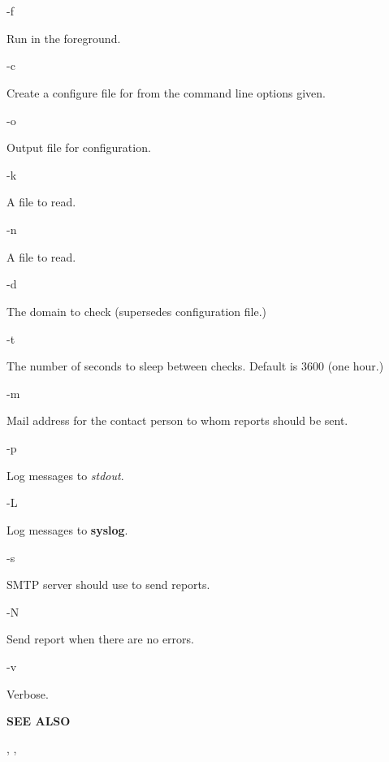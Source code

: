 \begin{description}

\item -f\verb" "

Run in the foreground.

\item -c\verb" "

Create a configure file for  from the command line options given.

\item -o\verb" "

Output file for configuration.

\item -k \verb" "

A  file to read.

\item -n \verb" "

A  file to read.

\item -d\verb" "

The domain to check (supersedes configuration file.)

\item -t\verb" "

The number of seconds to sleep between checks.  Default is 3600 (one hour.)

\item -m\verb" "

Mail address for the contact person to whom reports should be sent.

\item -p\verb" "

Log messages to {\it stdout}.

\item -L\verb" "

Log messages to {\bf syslog}.

\item -s\verb" "

SMTP server  should use to send reports.

\item -N\verb" "

Send report when there are no errors.

\item -v\verb" "

Verbose.

\end{description}

{\bf SEE ALSO}

,
,


